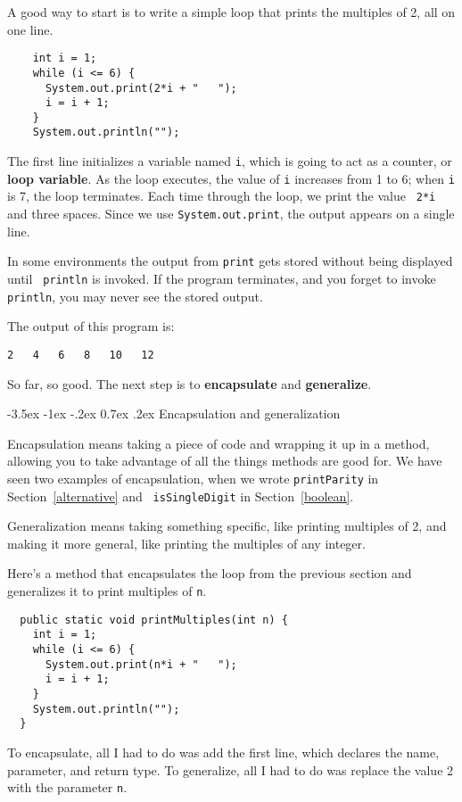 \documentclass{book}
\makeatletter
\renewcommand{\section}{\@startsection 
    {section} {1} {0mm}%
    {-3.5ex \@plus -1ex \@minus -.2ex}%
    {0.7ex \@plus.2ex}%
    {\normalfont\Large\bfseries}}
\makeatother
\begin{document}
A good way to start is to write a simple loop that prints
the multiples of 2, all on one line.

\begin{verbatim}
    int i = 1;
    while (i <= 6) {
      System.out.print(2*i + "   ");
      i = i + 1;
    }
    System.out.println("");
\end{verbatim}
%
The first line initializes a variable named {\tt i}, which is going
to act as a counter, or {\bf loop variable}.  As the loop executes,
the value of {\tt i} increases from 1 to 6; when {\tt i} is 7, the
loop terminates.  Each time through the loop, we print the value {\tt
  2*i} and three spaces.  Since we use {\tt System.out.print}, 
the output appears on a single line.


In some environments the
output from {\tt print} gets stored without being displayed until {\tt
println} is invoked.  If the program terminates, and you forget to
invoke {\tt println}, you may never see the stored output.

The output of this program is:

\begin{verbatim}
2   4   6   8   10   12
\end{verbatim}
%
So far, so good.  The next step is to {\bf encapsulate} and {\bf
generalize}.


\section {Encapsulation and generalization}
\label{encapsulation}

Encapsulation means taking a piece of code and wrapping it up
in a method, allowing you to take advantage of all the things methods
are good for.  We have seen two examples of encapsulation, when we
wrote {\tt printParity} in Section~\ref{alternative} and {\tt
isSingleDigit} in Section~\ref{boolean}.

Generalization means taking something specific, like printing
multiples of 2, and making it more general, like printing the
multiples of any integer.


Here's a method that encapsulates the loop from the previous
section and generalizes it to print multiples of {\tt n}.

\begin{verbatim}
  public static void printMultiples(int n) {
    int i = 1;
    while (i <= 6) {
      System.out.print(n*i + "   ");
      i = i + 1;
    }    
    System.out.println("");
  }
\end{verbatim}
%
To encapsulate, all I had to do was add the first line,
which declares the name, parameter,
and return type.  To generalize, all I had to do was replace
the value 2 with the parameter {\tt n}.
\end{document}
